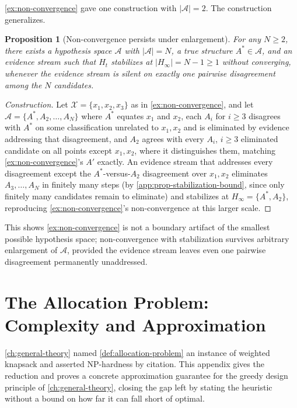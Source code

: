 \documentclass[11pt]{book}
\theoremstyle{plain}
\newtheorem{proposition}[theorem]{Proposition}
\theoremstyle{definition}
\theoremstyle{remark}
\begin{document}
\cref{ex:non-convergence} gave one construction with $|\mathcal{A}| =
2$. The construction generalizes.

\begin{proposition}[Non-convergence persists under enlargement]
\label{app:prop-non-convergence-family}
For any $N \geq 2$, there exists a hypothesis space $\mathcal{A}$ with
$|\mathcal{A}| = N$, a true structure $A^* \in \mathcal{A}$, and an
evidence stream such that $H_t$ stabilizes at $|H_\infty| = N - 1 \geq
1$ without converging, whenever the evidence stream is silent on
exactly one pairwise disagreement among the $N$ candidates.
\end{proposition}

\begin{proof}[Construction]
Let $\mathcal{X} = \{x_1, x_2, x_3\}$ as in \cref{ex:non-convergence},
and let $\mathcal{A} = \{A^*, A_2, \dots, A_N\}$ where $A^*$ equates
$x_1$ and $x_2$, each $A_i$ for $i \geq 3$ disagrees with $A^*$ on some
classification unrelated to $x_1, x_2$ and is eliminated by evidence
addressing that disagreement, and $A_2$ agrees with every $A_i$,
$i\geq 3$ eliminated candidate on all points except $x_1,x_2$, where
it distinguishes them, matching \cref{ex:non-convergence}'s $A'$
exactly. An evidence stream that addresses every disagreement except
the $A^*$-versus-$A_2$ disagreement over $x_1, x_2$ eliminates
$A_3,\dots,A_N$ in finitely many steps (by
\cref{app:prop-stabilization-bound}, since only finitely many
candidates remain to eliminate) and stabilizes at $H_\infty =
\{A^*, A_2\}$, reproducing \cref{ex:non-convergence}'s non-convergence
at this larger scale.
\end{proof}

This shows \cref{ex:non-convergence} is not a boundary artifact of the
smallest possible hypothesis space; non-convergence with stabilization
survives arbitrary enlargement of $\mathcal{A}$, provided the evidence
stream leaves even one pairwise disagreement permanently unaddressed.
\chapter{The Allocation Problem: Complexity and Approximation}
\label{app:allocation-complexity}

\cref{ch:general-theory} named \cref{def:allocation-problem} an
instance of weighted knapsack and asserted NP-hardness by citation.
This appendix gives the reduction and proves a concrete approximation
guarantee for the greedy design principle of
\cref{ch:general-theory}, closing the gap left by stating the
heuristic without a bound on how far it can fall short of optimal.
\end{document}
